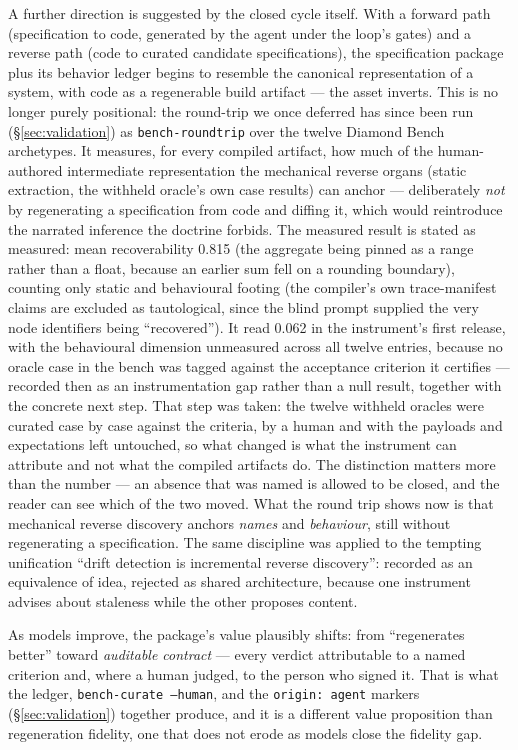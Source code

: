 \documentclass[11pt]{article}
\begin{document}
A further direction is suggested by the closed cycle itself. With a forward
path (specification to code, generated by the agent under the loop's gates)
and a reverse path (code to curated candidate specifications), the
specification package plus its behavior ledger begins to resemble the
canonical representation of a system, with code as a regenerable build
artifact --- the asset inverts. This is no longer purely positional: the
round-trip we once deferred has since been run (\S\ref{sec:validation}) as
\texttt{bench-roundtrip} over the twelve Diamond Bench archetypes. It
measures, for every compiled artifact, how much of the human-authored
intermediate representation the mechanical reverse organs (static extraction,
the withheld oracle's own case results) can anchor --- deliberately \emph{not}
by regenerating a specification from code and diffing it, which would
reintroduce the narrated inference the doctrine forbids. The measured result
is stated as measured: mean recoverability 0.815 (the aggregate being pinned as a
range rather than a float, because an earlier sum fell on a rounding boundary),
counting only static and behavioural footing (the compiler's own trace-manifest claims are excluded as
tautological, since the blind prompt supplied the very node identifiers being
``recovered''). It read 0.062 in the instrument's first release, with the
behavioural dimension unmeasured across all twelve entries, because no oracle
case in the bench was tagged against the acceptance criterion it certifies ---
recorded then as an instrumentation gap rather than a null result, together
with the concrete next step. That step was taken: the twelve withheld oracles
were curated case by case against the criteria, by a human and with the
payloads and expectations left untouched, so what changed is what the
instrument can attribute and not what the compiled artifacts do. The
distinction matters more than the number --- an absence that was named is
allowed to be closed, and the reader can see which of the two moved. What the
round trip shows now is that mechanical reverse discovery anchors \emph{names}
and \emph{behaviour}, still without regenerating a specification. The same discipline
was applied to the tempting unification ``drift detection is incremental
reverse discovery'': recorded as an equivalence of idea, rejected as shared
architecture, because one instrument advises about staleness while the other
proposes content.

As models improve, the package's value plausibly shifts: from ``regenerates
better'' toward \emph{auditable contract} --- every verdict attributable to a
named criterion and, where a human judged, to the person who signed it. That
is what the ledger, \texttt{bench-curate --human}, and the \texttt{origin:
agent} markers (\S\ref{sec:validation}) together produce, and it is a
different value proposition than regeneration fidelity, one that does not
erode as models close the fidelity gap.
\end{document}
